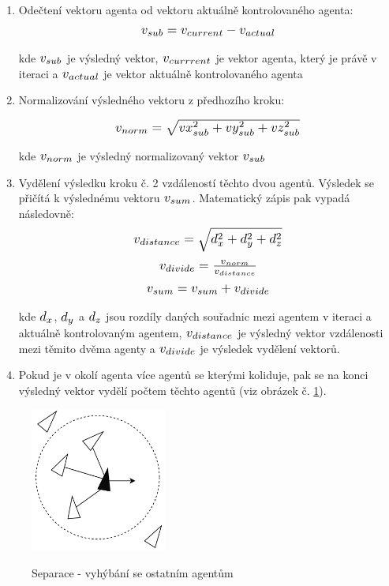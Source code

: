 \documentclass[czech,public,dept460,male,cpdeclaration]{diploma}
\begin{document}
\begin{enumerate}
	\item Odečtení vektoru agenta od vektoru aktuálně kontrolovaného agenta:
			\[ \scalebox{1.2}{$v_{sub} = v_{current} - v_{actual}$} \]
			
			kde \( \scalebox{1.2}{$v_{sub}$} \) je výsledný vektor, \( \scalebox{1.2}{$v_{currrent}$} \) je vektor agenta, který je právě v iteraci a \( \scalebox{1.2}{$v_{actual}$} \) je vektor aktuálně kontrolovaného agenta

	\item Normalizování výsledného vektoru z předhozího kroku:
	
			\[ \scalebox{1.2}{$v_{norm} = \sqrt{vx_{sub}^2 + vy_{sub}^2 + vz_{sub}^2}$} \]
			
			kde \( \scalebox{1.2}{$v_{norm}$} \) je výsledný normalizovaný vektor \( \scalebox{1.2}{$v_{sub}$} \)
	\item Vydělení výsledku kroku č. 2 vzdáleností těchto dvou agentů. Výsledek se přičítá k výslednému vektoru \( \scalebox{1.2}{$v_{sum}$} \). Matematický zápis pak vypadá následovně:
			\[ \scalebox{1.2}{$v_{distance} = \sqrt{d_x^2 + d_y^2 + d_z^2}$} \]
			\[ \scalebox{1.2}{$v_{divide} = \frac{v_{norm}}{v_{distance}}$} \]
			\[ \scalebox{1.2}{$v_{sum} = v_{sum} + v_{divide}$} \]
						
			kde \( \scalebox{1.2}{$d_{x}$} \), \( \scalebox{1.2}{$d_{y}$} \) a \( \scalebox{1.2}{$d_{z}$} \) jsou rozdíly daných souřadnic mezi agentem v iteraci a aktuálně kontrolovaným agentem, \( \scalebox{1.2}{$v_{distance}$} \) je výsledný vektor vzdálenosti mezi těmito dvěma agenty a \( \scalebox{1.2}{$v_{divide}$} \) je výsledek vydělení vektorů.
			
	\item Pokud je v okolí agenta více agentů se kterými koliduje, pak se na konci výsledný vektor vydělí počtem těchto agentů (viz obrázek č. \ref{fig:separationImg}).
\end{enumerate}

\begin{figure}[H]\centering\includegraphics[width=0.4\textwidth]{Figures/separation2.jpg}\label{fig:separationImg}
	\caption{Separace - vyhýbání se ostatním agentům}\label{fig:separationImg}
\end{figure}
\end{document}
